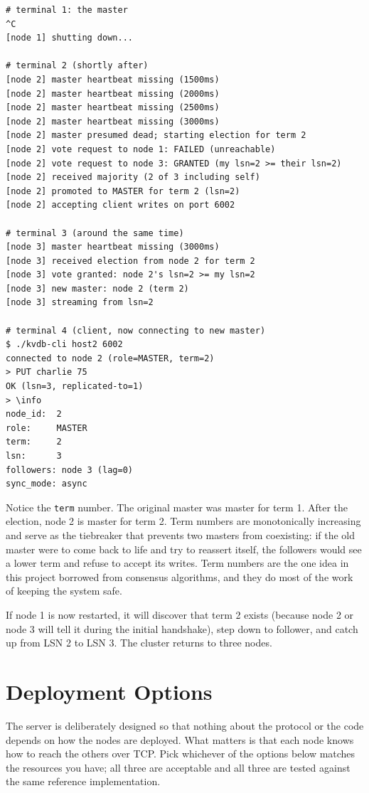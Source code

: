 \documentclass[11pt,a4paper]{article}
\begin{document}
\begin{codebox}
\begin{lstlisting}
# terminal 1: the master
^C
[node 1] shutting down...

# terminal 2 (shortly after)
[node 2] master heartbeat missing (1500ms)
[node 2] master heartbeat missing (2000ms)
[node 2] master heartbeat missing (2500ms)
[node 2] master heartbeat missing (3000ms)
[node 2] master presumed dead; starting election for term 2
[node 2] vote request to node 1: FAILED (unreachable)
[node 2] vote request to node 3: GRANTED (my lsn=2 >= their lsn=2)
[node 2] received majority (2 of 3 including self)
[node 2] promoted to MASTER for term 2 (lsn=2)
[node 2] accepting client writes on port 6002

# terminal 3 (around the same time)
[node 3] master heartbeat missing (3000ms)
[node 3] received election from node 2 for term 2
[node 3] vote granted: node 2's lsn=2 >= my lsn=2
[node 3] new master: node 2 (term 2)
[node 3] streaming from lsn=2

# terminal 4 (client, now connecting to new master)
$ ./kvdb-cli host2 6002
connected to node 2 (role=MASTER, term=2)
> PUT charlie 75
OK (lsn=3, replicated-to=1)
> \info
node_id:  2
role:     MASTER
term:     2
lsn:      3
followers: node 3 (lag=0)
sync_mode: async
\end{lstlisting}
\end{codebox}

Notice the \texttt{term} number. The original master was master for term 1. After the election, node 2 is master for term 2. Term numbers are monotonically increasing and serve as the tiebreaker that prevents two masters from coexisting: if the old master were to come back to life and try to reassert itself, the followers would see a lower term and refuse to accept its writes. Term numbers are the one idea in this project borrowed from consensus algorithms, and they do most of the work of keeping the system safe.

If node 1 is now restarted, it will discover that term 2 exists (because node 2 or node 3 will tell it during the initial handshake), step down to follower, and catch up from LSN 2 to LSN 3. The cluster returns to three nodes.

\section{Deployment Options}

The server is deliberately designed so that nothing about the protocol or the code depends on how the nodes are deployed. What matters is that each node knows how to reach the others over TCP. Pick whichever of the options below matches the resources you have; all three are acceptable and all three are tested against the same reference implementation.
\end{document}
